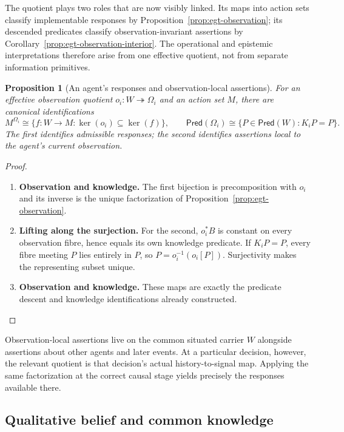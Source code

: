 \documentclass[11pt,a4paper]{article}
\numberwithin{equation}{section}
\newtheorem{proposition}[theorem]{Proposition}
\theoremstyle{definition}
\theoremstyle{remark}
\theoremstyle{plain}
\begin{document}
The quotient plays two roles that are now visibly linked. Its maps
into action sets classify implementable responses by
Proposition~\ref{prop:egt-observation}; its descended predicates classify
observation-invariant assertions by
Corollary~\ref{prop:egt-observation-interior}. The operational and
epistemic interpretations therefore arise from one effective quotient,
not from separate information primitives.

\begin{proposition}[An agent's responses and observation-local assertions]
\label{prop:egt-agent-observation-interface}
For an effective observation quotient $o_i:W\twoheadrightarrow\Omega_i$ and
an action set $M$, there are canonical identifications
\[
 M^{\Omega_i}\cong
 \{f:W\to M:\ker(o_i)\subseteq\ker(f)\},
 \qquad
 \mathsf{Pred}(\Omega_i)\cong
 \{P\in\mathsf{Pred}(W):K_iP=P\}.
\]
The first identifies admissible responses; the second identifies assertions
local to the agent's current observation.
\end{proposition}
\begin{proof}
\leavevmode
\begin{enumerate}[label=\textup{(\arabic*)},leftmargin=*,itemsep=4pt,topsep=3pt]
  \item \textbf{Observation and knowledge.} The first bijection is precomposition with $o_i$ and its inverse is the unique
factorization of Proposition~\ref{prop:egt-observation}.
  \item \textbf{Lifting along the surjection.} For the second,
$o_i^*B$ is constant on every observation fibre, hence equals its own
knowledge predicate. If $K_iP=P$, every fibre meeting $P$ lies entirely in
$P$, so $P=o_i^{-1}(o_i[P])$. Surjectivity makes the representing subset
unique.
  \item \textbf{Observation and knowledge.} These maps are exactly the predicate descent and knowledge
identifications already constructed.
\end{enumerate}
\end{proof}

Observation-local assertions live on the common situated carrier
$W$ alongside assertions about other agents and later events. At a
particular decision, however, the relevant quotient is that decision's
actual history-to-signal map. Applying the same factorization at the
correct causal stage yields precisely the responses available there.

\subsection{Qualitative belief and common knowledge}
\end{document}
